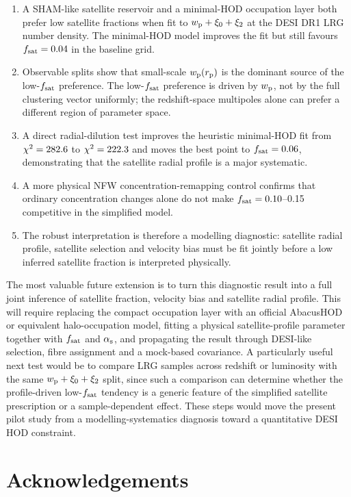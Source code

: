 \documentclass[fleqn,usenatbib]{mnras}
\newcommand{\fsat}{f_{\rm sat}}
\newcommand{\alphas}{\alpha_{\rm s}}
\newcommand{\wproj}{w_{\rm p}}
\newcommand{\xizero}{\xi_0}
\newcommand{\xitwo}{\xi_2}
\begin{document}
\begin{enumerate}
  \item A SHAM-like satellite reservoir and a minimal-HOD occupation layer both prefer low satellite fractions when fit to $\wproj+\xizero+\xitwo$ at the DESI DR1 LRG number density.  The minimal-HOD model improves the fit but still favours $\fsat=\BestHODFsat$ in the baseline grid.
  \item Observable splits show that small-scale $\wproj(r_{\rm p})$ is the dominant source of the low-$\fsat$ preference.  The low-$\fsat$ preference is driven by $\wproj$, not by the full clustering vector uniformly; the redshift-space multipoles alone can prefer a different region of parameter space.
  \item A direct radial-dilution test improves the heuristic minimal-HOD fit from $\chi^2=282.6$ to $\chi^2=222.3$ and moves the best point to $\fsat=\BestDilFsat$, demonstrating that the satellite radial profile is a major systematic.
  \item A more physical NFW concentration-remapping control confirms that ordinary concentration changes alone do not make $\fsat=0.10$--0.15 competitive in the simplified model.
  \item The robust interpretation is therefore a modelling diagnostic: satellite radial profile, satellite selection and velocity bias must be fit jointly before a low inferred satellite fraction is interpreted physically.
\end{enumerate}

The most valuable future extension is to turn this diagnostic result into a full joint inference of satellite fraction, velocity bias and satellite radial profile.  This will require replacing the compact occupation layer with an official AbacusHOD or equivalent halo-occupation model, fitting a physical satellite-profile parameter together with $\fsat$ and $\alphas$, and propagating the result through DESI-like selection, fibre assignment and a mock-based covariance.  A particularly useful next test would be to compare LRG samples across redshift or luminosity with the same $\wproj+\xizero+\xitwo$ split, since such a comparison can determine whether the profile-driven low-$\fsat$ tendency is a generic feature of the simplified satellite prescription or a sample-dependent effect.  These steps would move the present pilot study from a modelling-systematics diagnosis toward a quantitative DESI HOD constraint.

\section*{Acknowledgements}
\end{document}
